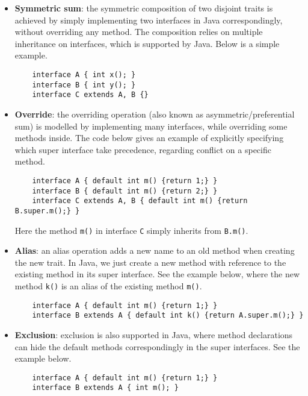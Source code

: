\begin{itemize}
\item \textbf{Symmetric sum}: the symmetric composition of two disjoint traits is achieved by simply implementing two interfaces in Java correspondingly, without overriding any method. The composition relies on multiple inheritance on interfaces, which is supported by Java. Below is a simple example.
    \begin{lstlisting}
    interface A { int x(); }
    interface B { int y(); }
    interface C extends A, B {}
    \end{lstlisting}
\item \textbf{Override}: the overriding operation (also known as asymmetric/preferential sum) is modelled by implementing many interfaces, while overriding some methods inside. The code below gives an example of explicitly specifying which super interface take precedence, regarding conflict on a specific method.
    \begin{lstlisting}
    interface A { default int m() {return 1;} }
    interface B { default int m() {return 2;} }
    interface C extends A, B { default int m() {return B.super.m();} }
    \end{lstlisting}
    Here the method \texttt{m()} in interface \texttt{C} simply inherits from \texttt{B.m()}.
\item \textbf{Alias}: an alias operation adds a new name to an old method when creating the new trait. In Java, we just create a new method with reference to the existing method in its super interface. See the example below, where the new method \texttt{k()} is an alias of the existing method \texttt{m()}.
    \begin{lstlisting}
    interface A { default int m() {return 1;} }
    interface B extends A { default int k() {return A.super.m();} }
    \end{lstlisting}
\item \textbf{Exclusion}: exclusion is also supported in Java, where method declarations can hide the default methods correspondingly in the super interfaces. See the example below.
    \begin{lstlisting}
    interface A { default int m() {return 1;} }
    interface B extends A { int m(); }
    \end{lstlisting}
\end{itemize}

